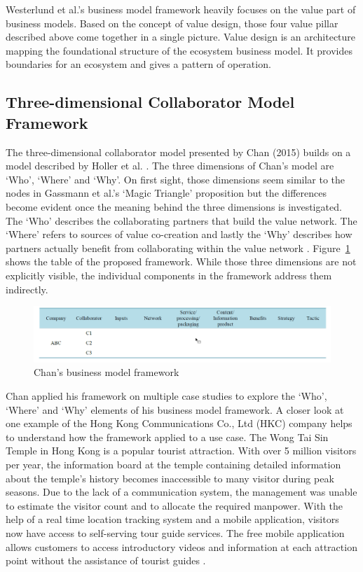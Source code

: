 		Westerlund et al.'s business model framework heavily focuses on the value part of business models. Based on the concept of value design, those four value pillar described above come together in a single picture. Value design is an architecture mapping the foundational structure of the ecosystem business model. It provides boundaries for an ecosystem and gives a pattern of operation.

	\subsection{Three-dimensional Collaborator Model Framework}
		The three-dimensional collaborator model presented by Chan (2015) \cite{chan} builds on a model described by Holler et al. \cite{holler}. The three dimensions of Chan's model are `Who', `Where' and `Why'. On first sight, those dimensions seem similar to the nodes in Gassmann et al.'s `Magic Triangle' proposition but the differences become evident once the meaning behind the three dimensions is investigated. The `Who' describes the collaborating partners that build the value network. The `Where' refers to sources of value co-creation and lastly the `Why' describes how partners actually benefit from collaborating within the value network \cite{chan}. Figure~\ref{fig:chan} shows the table of the proposed framework. While those three dimensions are not explicitly visible, the individual components in the framework address them indirectly.

		\begin{figure}[ht]
		    \begin{center}
		    \includegraphics[scale=0.5]{Talk11/chan.png}
		    \end{center}
		    \caption{Chan's business model framework \cite[p.~559]{chan}}
		    \label{fig:chan}
		\end{figure}

		Chan applied his framework on multiple case studies to explore the `Who', `Where' and `Why' elements of his business model framework. A closer look at one example of the Hong Kong Communications Co., Ltd (HKC) company helps to understand how the framework applied to a use case. The Wong Tai Sin Temple in Hong Kong is a popular tourist attraction. With over 5 million visitors per year, the information board at the temple containing detailed information about the temple's history becomes inaccessible to many visitor during peak seasons. Due to the lack of a communication system, the management was unable to estimate the visitor count and to allocate the required manpower. With the help of a real time location tracking system and a mobile application, visitors now have access to self-serving tour guide services. The free mobile application allows customers to access introductory videos and information at each attraction point without the assistance of tourist guides \cite[p.~560]{chan}. 

